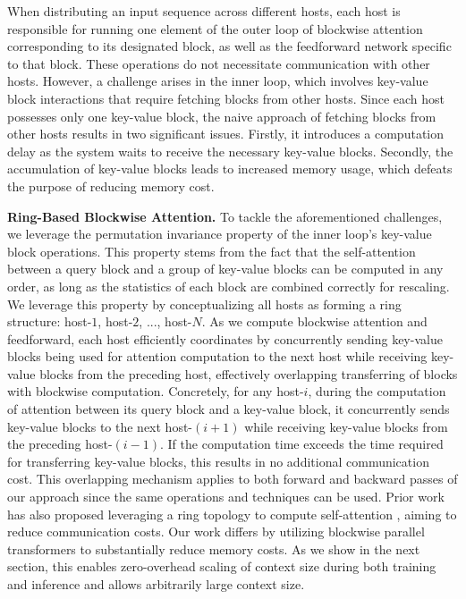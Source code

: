 \documentclass{article}
\begin{document}
When distributing an input sequence across different hosts, each host is responsible for running one element of the outer loop of blockwise attention corresponding to its designated block, as well as the feedforward network specific to that block. These operations do not necessitate communication with other hosts. However, a challenge arises in the inner loop, which involves key-value block interactions that require fetching blocks from other hosts. Since each host possesses only one key-value block, the naive approach of fetching blocks from other hosts results in two significant issues. Firstly, it introduces a computation delay as the system waits to receive the necessary key-value blocks. Secondly, the accumulation of key-value blocks leads to increased memory usage, which defeats the purpose of reducing memory cost.

\textbf{Ring-Based Blockwise Attention.} To tackle the aforementioned challenges, we leverage the permutation invariance property of the inner loop's key-value block operations. This property stems from the fact that the self-attention between a query block and a group of key-value blocks can be computed in any order, as long as the statistics of each block are combined correctly for rescaling.
We leverage this property by conceptualizing all hosts as forming a ring structure: host-$1$, host-$2$, ..., host-$N$. As we compute blockwise attention and feedforward, each host efficiently coordinates by concurrently sending key-value blocks being used for attention computation to the next host while receiving key-value blocks from the preceding host, effectively overlapping transferring of blocks with blockwise computation.
Concretely, for any host-$i$, during the computation of attention between its query block and a key-value block,
it concurrently sends key-value blocks to the next host-$(i+1)$ while receiving key-value blocks from the preceding host-$(i-1)$.
If the computation time exceeds the time required for transferring key-value blocks, this results in no additional communication cost.
This overlapping mechanism applies to both forward and backward passes of our approach since the same operations and techniques can be used.
Prior work has also proposed leveraging a ring topology to compute self-attention \citep{li2021sequence}, aiming to reduce communication costs. Our work differs by utilizing blockwise parallel transformers to substantially reduce memory costs. As we show in the next section, this enables zero-overhead scaling of context size during both training and inference and allows arbitrarily large context size.
\end{document}
